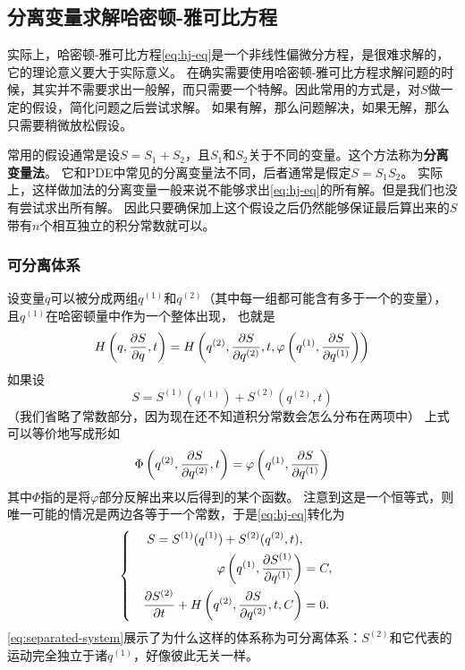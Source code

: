 \documentclass[UTF8, a4paper]{ctexart}
\newenvironment{bigcase}{\left\{\quad\begin{aligned}}{\end{aligned}\right.}
\begin{document}
\subsection{分离变量求解哈密顿-雅可比方程}

实际上，哈密顿-雅可比方程\eqref{eq:hj-eq}是一个非线性偏微分方程，是很难求解的，它的理论意义要大于实际意义。
在确实需要使用哈密顿-雅可比方程求解问题的时候，其实并不需要求出一般解，而只需要一个特解。因此常用的方式是，对$S$做一定的假设，简化问题之后尝试求解。
如果有解，那么问题解决，如果无解，那么只需要稍微放松假设。

常用的假设通常是设$S=S_1+S_2$，且$S_1$和$S_2$关于不同的变量。这个方法称为\textbf{分离变量法}。
它和PDE中常见的分离变量法不同，后者通常是假定$S=S_1 S_2$。
实际上，这样做加法的分离变量一般来说不能够求出\eqref{eq:hj-eq}的所有解。但是我们也没有尝试求出所有解。
因此只要确保加上这个假设之后仍然能够保证最后算出来的$S$带有$n$个相互独立的积分常数就可以。

\subsubsection{可分离体系}\label{sec:separation-of-variables}

设变量$q$可以被分成两组$q^{(1)}$和$q^{(2)}$（其中每一组都可能含有多于一个的变量），且$q^{(1)}$在哈密顿量中作为一个整体出现，
也就是
\begin{equation}
    H \left( q, \pdv{S}{q}, t \right) = H\left( q^{(2)}, \pdv{S}{q^{(2)}}, t, \varphi \left(
        q^{(1)}, \pdv{S}{q^{(1)}}
    \right) \right)    
\end{equation}
如果设
\[
    S = S^{(1)}(q^{(1)}) + S^{(2)}(q^{(2)}, t)
\]
（我们省略了常数部分，因为现在还不知道积分常数会怎么分布在两项中）
上式可以等价地写成形如
\[
    \Phi \left( q^{(2)}, \pdv{S}{q^{(2)}}, t \right) = \varphi \left(
        q^{(1)}, \pdv{S}{q^{(1)}}
    \right)
\]
其中$\Phi$指的是将$\varphi$部分反解出来以后得到的某个函数。
注意到这是一个恒等式，则唯一可能的情况是两边各等于一个常数，于是\eqref{eq:hj-eq}转化为
\begin{equation}
    \begin{bigcase}
        S = S^{(1)}(q^{(1)}) + S^{(2)}(q^{(2)}, t), \\
        \varphi \left(q^{(1)}, \pdv{S^{(1)}}{q^{(1)}} \right) &= C, \\
        \pdv{S^{(2)}}{t} + H\left( q^{(2)}, \pdv{S}{q^{(2)}}, t, C \right) &= 0.
    \end{bigcase}
    \label{eq:separated-system}
\end{equation}
\eqref{eq:separated-system}展示了为什么这样的体系称为可分离体系：$S^{(2)}$和它代表的运动完全独立于诸$q^{(1)}$，好像彼此无关一样。
\end{document}
